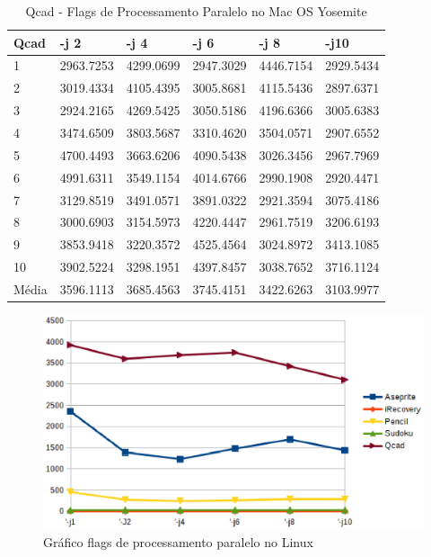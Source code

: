 \begin{table}[!ht]
\centering
\caption{Qcad - Flags de Processamento Paralelo no Mac OS Yosemite}
\label{tab:flag_processamento_paralelo:mac:qcad}
\begin{tabular}{llllll}
\textbf{Qcad} & \textbf{-j 2} & \textbf{-j 4} & \textbf{-j 6} & \textbf{-j 8} & \textbf{-j10}  \\ \toprule
1            & 2963.7253  &  4299.0699 &   2947.3029 &   4446.7154 &   2929.5434  \\ 
2            & 3019.4334  &  4105.4395 &   3005.8681 &   4115.5436 &   2897.6371  \\ 
3            & 2924.2165  &  4269.5425 &   3050.5186 &   4196.6366 &   3005.6383  \\ 
4            & 3474.6509  &  3803.5687 &   3310.4620 &   3504.0571 &   2907.6552  \\ 
5            & 4700.4493  &  3663.6206 &   4090.5438 &   3026.3456 &   2967.7969  \\ 
6            & 4991.6311  &  3549.1154 &   4014.6766 &   2990.1908 &   2920.4471  \\ 
7            & 3129.8519  &  3491.0571 &   3891.0322 &   2921.3594 &   3075.4186  \\ 
8            & 3000.6903  &  3154.5973 &   4220.4447 &   2961.7519 &   3206.6193  \\ 
9            & 3853.9418  &  3220.3572 &   4525.4564 &   3024.8972 &   3413.1085  \\ 
10           & 3902.5224  &  3298.1951 &   4397.8457 &   3038.7652 &   3716.1124  \\ \bottomrule
Média        & 3596.1113  &  3685.4563 &   3745.4151 &   3422.6263 &   3103.9977  \\ 
\end{tabular}
\end{table}

        \begin{figure}[!h]
            \centering
                \includegraphics{figuras/graficos/linux_processamento_paralelo.eps}
            \caption{Gráfico flags de processamento paralelo no Linux}
            \label{flags_de_processamento_paralelo_linux}
        \end{figure}

